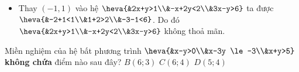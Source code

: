 \begin{ex}
{\begin{itemize}
			\item Thay $(-1,1)$ vào hệ $\heva{&2x+y>1\\&-x+2y<2\\&3x-y>6}$ ta được $\heva{&-2+1<1\\&1+2>2\\&-3-1<6}$. Do đó $\heva{&2x+y>1\\&-x+2y<2\\&3x-y>6}$ không thoả mãn.
		\end{itemize} }
	\end{ex}
	
	\begin{ex}%
		Miền nghiệm của hệ bất phương trình $\heva{&x-y>0\\&x-3y \le -3\\&x+y>5}$ \textbf{không chứa} điểm nào sau đây?
		{$B\left(6; 3\right)$}
		{$C\left(6; 4\right)$}
		{$D\left(5; 4\right)$}
	\end{ex}
	
